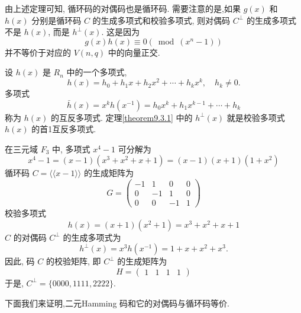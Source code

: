 由上述定理可知, 循环码的对偶码也是循环码. 需要注意的是,如果 $ g(x) $ 和 $ h(x) $ 分别是循环码 $ C $ 的生成多项式和校验多项式, 则对偶码 $ C^{\perp} $ 的生成多项式不是 $ h(x) $, 而是 $ h^{\perp}(x) $. 这是因为
$$
g(x) h(x) \equiv 0\left(\bmod \left(x^{n}-1\right)\right)
$$
并不等价于对应的 $ V(n, q) $ 中的向量正交.

设 $ h(x) $ 是 $ R_{n} $ 中的一个多项式,
$$
h(x)=h_{0}+h_{1} x+h_{2} x^{2}+\cdots+h_{k} x^{k}, \quad h_{k} \neq 0 .
$$
多项式
$$
\bar{h}(x)=x^{k} h\left(x^{-1}\right)=h_{0} x^{k}+h_{1} x^{k-1}+\cdots+h_{k}
$$
称为 $ h(x) $ 的互反多项式. 定理\ref{theorem9.3.1} 中的 $ h^{\perp}(x) $ 就是校验多项式 $ h(x) $ 的首1互反多项式.

\begin{example}
 在三元域 $ F_{3} $ 中, 多项式 $ x^{4}-1 $ 可分解为
$$
x^{4}-1=(x-1)\left(x^{3}+x^{2}+x+1\right)=(x-1)(x+1)\left(1+x^{2}\right)
$$
循环码 $ C=\langle\langle x-1\rangle\rangle $ 的生成矩阵为
$$
G=\left(\begin{array}{cccc}
-1 & 1 & 0 & 0 \\
0 & -1 & 1 & 0 \\
0 & 0 & -1 & 1
\end{array}\right)
$$
校验多项式
$$
h(x)=(x+1)\left(x^{2}+1\right)=x^{3}+x^{2}+x+1
$$
$ C $ 的对偶码 $ C^{\perp} $ 的生成多项式为
$$
h^{\perp}(x)=x^{3} h\left(x^{-1}\right)=1+x+x^{2}+x^{3} .
$$
因此, 码 $ C $ 的校验矩阵, 即 $ C^{\perp} $ 的生成矩阵为
$$
H=\left(\begin{array}{llll}
1 & 1 & 1 & 1
\end{array}\right)
$$
于是, $ C^{\perp}=\{0000,1111,2222\} $.
\end{example}


下面我们来证明,二元Hamming 码和它的对偶码与循环码等价.

